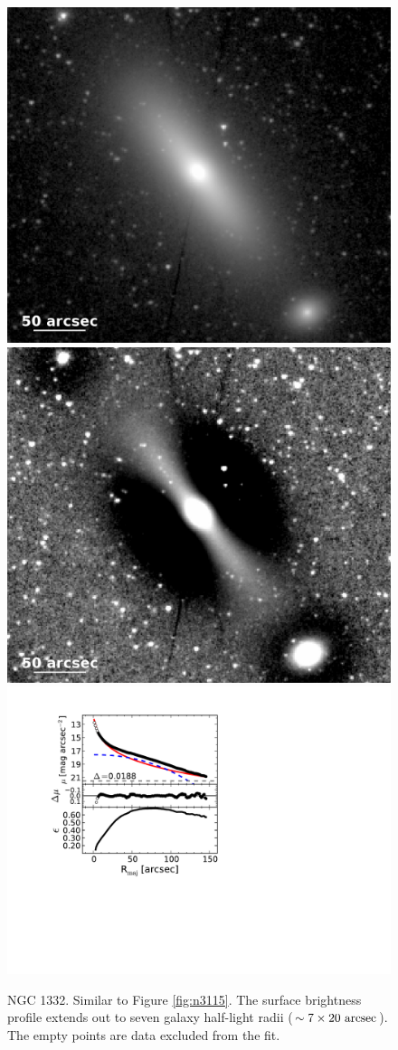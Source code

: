 \documentclass[useAMS,usenatbib,article]{mnras}
\begin{document}
\begin{figure}
\begin{center}
\includegraphics[width=0.49\columnwidth]{n1332_image}
\includegraphics[width=0.49\columnwidth]{n1332_unsharp} \\
\includegraphics[width=1.03\columnwidth]{n1332_decomposition.pdf}
\caption{NGC 1332.
Similar to Figure \ref{fig:n3115}. 
The surface brightness profile extends out to seven galaxy half-light radii ($\sim 7 \times 20~\rm arcsec$). 
The empty points are data excluded from the fit. 
}
\label{fig:n1332}
\end{center}
\end{figure}
\end{document}
